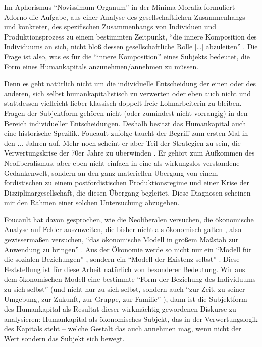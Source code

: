 \documentclass[12pt,
               DIV13,
               paper=a4,
               twoside=false,
               onehalfspacing,
               bibliography=totoc,
               toc=graduated,
               draft,
               ]{scrartcl}
\newcommand{\lips}{\dots\unkern}
\newcommand{\pc}[2]{\parencite[#1]{#2}}
\newcommand{\vgl}[2]{\parencite[vgl.][#1]{#2}}
\newcommand{\worries}[1]{\ifdraft{\textcolor{blue}{\texttt{(#1)}}}{}}
\begin{document}
Im Aphorismus "`Novissimum Organum"' in der Minima Moralia formuliert
Adorno die Aufgabe, aus einer Analyse des gesellschaftlichen
Zusammenhangs und konkreter, des spezifischen Zusammenhangs von
Individuen und Produktionsprozess zu einem bestimmten Zeitpunkt, "`die
innere Komposition des Individuums an sich, nicht bloß dessen
gesellschaftliche Rolle [\lips] abzuleiten"' \pc{261}{min}. Die Frage
ist also, was es für die "`innere Komposition"' eines Subjekts
bedeutet, die Form eines Humankapitals anzunehmen/annehmen zu müssen.

Denn es geht natürlich nicht um die individuelle Entscheidung der
einen oder des anderen, sich selbst humankapitalistisch zu verwerten
oder eben auch nicht und stattdessen vielleicht lieber klassisch
doppelt-freie Lohnarbeiterin zu bleiben. Fragen der Subjektform
gehören nicht (oder zumindest nicht vorrangig) in den Bereich
individueller Entscheidungen. Deshalb besitzt das Humankapital auch
eine historische Spezifik. Foucault zufolge taucht der Begriff zum
ersten Mal in den ... Jahren \worries{?} auf. Mehr noch scheint er
aber Teil der Strategien zu sein, die Verwertungskrise der 70er Jahre
zu überwinden \worries{?} \vgl{xx}{gbp}. Er gehört zum Aufkommen des
Neoliberalismus, aber eben nicht einfach in eine als wirkungslos
verstandene Gedankenwelt, sondern an den ganz materiellen Übergang von
einem fordistischen zu einem postfordistischen Produktionsregime und
einer Krise der Disziplinargesellschaft, die diesen Übergang
begleitet. Diese Diagnosen scheinen mir den Rahmen einer solchen
\worries{?} Untersuchung abzugeben.

Foucault hat davon gesprochen, wie die Neoliberalen versuchen, die
ökonomische Analyse auf Felder auszuweiten, die bisher nicht als
ökonomisch galten \vgl{305}{gbp}, also gewissermaßen versuchen, "`das
ökonomische Modell in großem Maßstab zur Anwendung zu bringen"'
\pc{334}{gbp}. Aus der Ökonomie werde so nicht nur ein "`Modell für
die sozialen Beziehungen"' \pc{334}{gbp}, sondern ein "`Modell der
Existenz selbst"' \pc{334}{gbp}. Diese Feststellung ist für diese
Arbeit natürlich von besonderer Bedeutung. Wir aus dem ökonomischen
Modell eine bestimmte "`Form der Beziehung des Individuums zu sich
selbst"' \pc{334}{gbp} (und nicht nur zu sich selbst, sondern auch
"`zur Zeit, zu seiner Umgebung, zur Zukunft, zur Gruppe, zur Familie"'
\pc{334}{gbp}), dann ist die Subjektform des Humankapital als Resultat
dieser wirkmächtig gewordenen Diskurse zu analysieren: Humankapital
als ökonomisches Subjekt, das in der Verwertungslogik des Kapitals
steht -- welche Gestalt das auch annehmen mag, wenn nicht der Wert
sondern das Subjekt sich bewegt.
\end{document}
